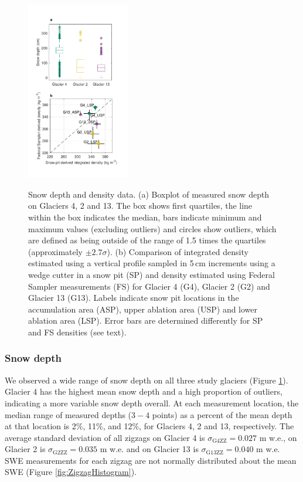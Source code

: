 \documentclass[twocolumn, letterpaper]{igs}
\begin{document}
\begin{figure}
	\centering
	\includegraphics[width =0.4\textwidth]{DepthBoxplot_SPvsFS.pdf}\\
	\caption{Snow depth and density data. (a) Boxplot of measured snow depth on Glaciers 4, 2 and 13. The box shows first quartiles, the line within the box indicates the median, bars indicate minimum and maximum values (excluding outliers) and circles show outliers, which are defined as being outside of the range of 1.5 times the quartiles (approximately $\pm2.7\sigma$). (b) Comparison of integrated density estimated using a vertical profile sampled in 5\,cm increments using a wedge cutter in a snow pit (SP) and density estimated using Federal Sampler measurements (FS) for Glacier 4 (G4), Glacier 2 (G2) and Glacier 13 (G13). Labels indicate snow pit locations in the accumulation area (ASP), upper ablation area (USP) and lower ablation area (LSP). Error bars are determined differently for SP and FS densities (see text).}
	\label{fig:DepthBoxplot_SPvsFS}
\end{figure}


\subsubsection{Snow depth}
We observed a wide range of snow depth on all three study glaciers (Figure \ref{fig:DepthBoxplot_SPvsFS}). Glacier 4 has the highest mean snow depth and a high proportion of outliers, indicating a more variable snow depth overall. At each measurement location, the median range of measured depths ($3-4$ points) as a percent of the mean depth at that location is 2\%, 11\%, and 12\%, for Glaciers 4, 2 and 13, respectively. The average standard deviation of all zigzags on Glacier 4 is $\sigma_{\mathrm{G4ZZ}} =  0.027$ m w.e., on Glacier 2 is $\sigma_{\mathrm{G2ZZ}} =  0.035$ m w.e. and on Glacier 13 is $\sigma_{\mathrm{G13ZZ}} =  0.040$ m w.e. SWE measurements for each zigzag are not normally distributed about the mean SWE (Figure \ref{fig:ZigzagHistogram}).
\end{document}
